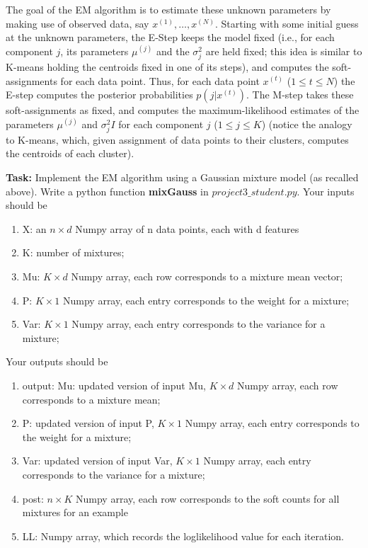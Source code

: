 \begin{enumerate}
\begin{enumerate}
    The goal of the EM algorithm is to estimate these unknown parameters by making use of observed data, say $x^{(1)},\ldots, x^{(N)}$. Starting with some initial guess at the unknown parameters, the E-Step keeps the model fixed (i.e., for each component $j$, its parameters $\mu^{(j)}$ and the $\sigma^2_{j}$ are held fixed; this idea is similar to K-means holding the centroids fixed in one of its steps), and computes the soft-assignments for each data point. Thus, for each data point $x^{(t)}$ ($1 \le t \le N$) the E-step computes the posterior probabilities $p(j | x^{(t)})$. The M-step takes these soft-assignments as fixed, and computes the maximum-likelihood estimates of the parameters $\mu^{(j)}$ and $\sigma_j^2I$ for each component $j$ ($1 \le j \le K$) (notice the analogy to K-means, which, given assignment of data points to their clusters, computes the centroids of each cluster).

    \textbf{Task:} Implement the EM algorithm using a Gaussian mixture model (as recalled above). Write a python function
    \textbf{mixGauss} in \texttt{$project3\_student.py$}. Your inputs should be
    \begin{enumerate}
    \item X: an $n \times d$ Numpy array of n data points, each with d features
    \item K: number of mixtures; 
    \item Mu: $K \times d$ Numpy array, each row corresponds to a mixture mean vector;
    \item P: $K \times 1$ Numpy array, each entry corresponds to the weight for a mixture;
    \item Var: $K \times 1$ Numpy array, each entry corresponds to the variance for a mixture;
    \end{enumerate}
    Your outputs should be
    \begin{enumerate}
    \item output: Mu: updated version of input Mu, $K \times d$ Numpy array, each row corresponds to a mixture mean;
    \item P: updated version of input P, $K \times 1$ Numpy array, each entry corresponds to the weight for a mixture;
    \item Var: updated version of input Var, $K \times 1$ Numpy array, each entry corresponds to the variance for a mixture;
    \item post: $n \times K$ Numpy array, each row corresponds to the soft counts for all mixtures for an example
    \item LL: Numpy array, which records the loglikelihood value for each iteration.
    \end{enumerate}


\end{enumerate}
\end{enumerate}
